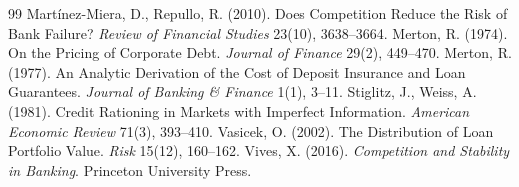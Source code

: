 \documentclass[11pt]{article}
\theoremstyle{plain}
\theoremstyle{definition}
\theoremstyle{remark}
\newcommand{\1}{\mathbf{1}}
\begin{document}
\begin{thebibliography}{99}
 Martínez-Miera, D., Repullo, R. (2010). Does Competition Reduce the Risk of Bank Failure? \textit{Review of Financial Studies} 23(10), 3638--3664.
 Merton, R. (1974). On the Pricing of Corporate Debt. \textit{Journal of Finance} 29(2), 449--470.
 Merton, R. (1977). An Analytic Derivation of the Cost of Deposit Insurance and Loan Guarantees. \textit{Journal of Banking \& Finance} 1(1), 3--11.
 Stiglitz, J., Weiss, A. (1981). Credit Rationing in Markets with Imperfect Information. \textit{American Economic Review} 71(3), 393--410.
 Vasicek, O. (2002). The Distribution of Loan Portfolio Value. \textit{Risk} 15(12), 160--162.
 Vives, X. (2016). \textit{Competition and Stability in Banking}. Princeton University Press.
\end{thebibliography}
\end{document}
